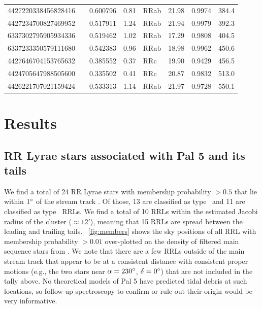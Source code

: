 \documentclass[twocolumn]{aastex63}
\begin{document}
\begin{table}[t]
\begin{footnotesize}
\begin{tabular}{llllllll}
4427220338456828416 &     & 0.600796& 0.81 & RRab & 21.98 & 0.9974 & 384.4 \\
4427234700827469952 &     & 0.517911& 1.24 & RRab & 21.94 & 0.9979 & 392.3 \\
6337302795905934336 &     & 0.519462& 1.02 & RRab & 17.29 & 0.9808 & 404.5 \\
6337233350579111680 &     & 0.542383& 0.96 & RRab & 18.98 & 0.9962 & 450.6 \\
4427646704153765632 &     & 0.385552& 0.37 & RRc  & 19.90 & 0.9429 & 456.5 \\
4424705647988505600 &     & 0.335502& 0.41 & RRc  & 20.87 & 0.9832 & 513.0 \\
4426221707021159424 &     & 0.533313& 1.14 & RRab & 21.97 & 0.9728 & 550.1 \\
\bottomrule
\end{tabular}
\end{footnotesize}
\end{table}


\section{Results} \label{sec:results}

\subsection{RR Lyrae stars associated with Pal 5 and its tails}

We find a total of 24 RR Lyrae stars with membership probability $> 0.5$ that lie within $1\mbox{$^\circ$}$ of the stream track \citep[again using the track from][]{Bonaca:2019}.
Of those, 13 are classified as type \typeab\ and 11 are classified as type \typec\ RRLs.
We find a total of 10 RRLs within the estimated Jacobi radius of the cluster ($\approx 12'$), meaning that 15 RRLs are spread between the leading and trailing tails.
\figurename~\ref{fig:members} shows the sky positions of all RRL with membership probability $>0.01$ over-plotted on the density of filtered main sequence stars from \citet{Bonaca:2019}.
We note that there are a few RRLs outside of the main stream track that appear to be at a consistent distance with consistent proper motions (e.g., the two stars near $\alpha = 230\mbox{$^\circ$}$, $\delta = 0\mbox{$^\circ$}$) that are not included in the tally above.
No theoretical models of Pal 5 have predicted tidal debris at such locations, so follow-up spectroscopy to confirm or rule out their origin would be very informative.
\end{document}
